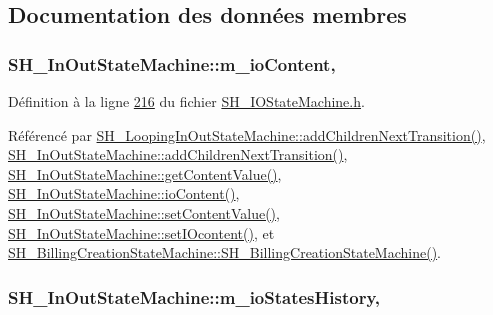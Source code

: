 \subsection{Documentation des données membres}
\hypertarget{classSH__InOutStateMachine_a8cfbc27eef057bf37b7711bdfef2077e}{
\subsubsection[{m\-\_\-io\-Content}]{\setlength{\rightskip}{0pt plus 5cm}S\-H\-\_\-\-In\-Out\-State\-Machine\-::m\-\_\-io\-Content\hspace{0.3cm}{\ttfamily [protected]}, {\ttfamily [inherited]}}}\label{classSH__InOutStateMachine_a8cfbc27eef057bf37b7711bdfef2077e}


Définition à la ligne \hyperlink{SH__IOStateMachine_8h_source_l00216}{216} du fichier \hyperlink{SH__IOStateMachine_8h_source}{S\-H\-\_\-\-I\-O\-State\-Machine.\-h}.



Référencé par \hyperlink{classSH__LoopingInOutStateMachine_abfae9f47019379f270496de46845c729}{S\-H\-\_\-\-Looping\-In\-Out\-State\-Machine\-::add\-Children\-Next\-Transition()}, \hyperlink{classSH__InOutStateMachine_aa78420f8778d7777809aad77eb8473b4}{S\-H\-\_\-\-In\-Out\-State\-Machine\-::add\-Children\-Next\-Transition()}, \hyperlink{classSH__InOutStateMachine_aa1a3bd3c0ea8a59b9bc916dc718eb9ca}{S\-H\-\_\-\-In\-Out\-State\-Machine\-::get\-Content\-Value()}, \hyperlink{classSH__InOutStateMachine_aaca105fbd5f5cc3bac115389ad3694c5}{S\-H\-\_\-\-In\-Out\-State\-Machine\-::io\-Content()}, \hyperlink{classSH__InOutStateMachine_a9ab1534306b2bdb62743d4bcefe40c17}{S\-H\-\_\-\-In\-Out\-State\-Machine\-::set\-Content\-Value()}, \hyperlink{classSH__InOutStateMachine_a8271a7ec7d5f6502449dd3b4da5f4155}{S\-H\-\_\-\-In\-Out\-State\-Machine\-::set\-I\-Ocontent()}, et \hyperlink{classSH__BillingCreationStateMachine_ad62b77fa4aeafe200056ff3974562f83}{S\-H\-\_\-\-Billing\-Creation\-State\-Machine\-::\-S\-H\-\_\-\-Billing\-Creation\-State\-Machine()}.

\hypertarget{classSH__InOutStateMachine_ac46ad1af230e1b2156d805275690dec3}{
\subsubsection[{m\-\_\-io\-States\-History}]{\setlength{\rightskip}{0pt plus 5cm}S\-H\-\_\-\-In\-Out\-State\-Machine\-::m\-\_\-io\-States\-History\hspace{0.3cm}{\ttfamily [protected]}, {\ttfamily [inherited]}}}\label{classSH__InOutStateMachine_ac46ad1af230e1b2156d805275690dec3}


